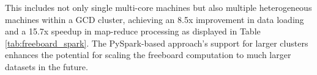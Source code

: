 %
This includes not only single multi-core machines but also multiple heterogeneous machines within a GCD cluster, achieving an 8.5x improvement in data loading and a 15.7x speedup in map-reduce processing as displayed in Table \ref{tab:freeboard_spark}. The PySpark-based approach's support for larger clusters enhances the potential for scaling the freeboard computation to much larger datasets in the future.